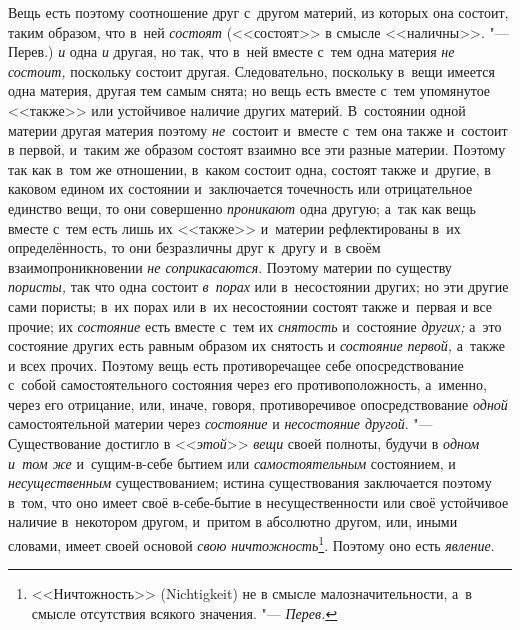 Вещь есть поэтому соотношение друг с~другом материй, из которых она состоит,
таким образом, что в~ней {\em состоят} (<<состоят>> в
смысле <<наличны>>. "--- Перев.) {\em и} одна
{\em и} другая, но так, что в~ней вместе с~тем одна
материя {\em не состоит,} поскольку состоит другая.
Следовательно, поскольку в~вещи имеется одна материя, другая тем самым
снята; но вещь есть вместе с~тем упомянутое <<также>> или устойчивое наличие
других материй. В~состоянии одной материи другая материя поэтому
{\em не}~состоит и~вместе с~тем она также и~состоит в
первой, и~таким же образом состоят взаимно все эти разные материи. Поэтому
так как в~том же отношении, в~каком состоит одна, состоят также и~другие, в
каковом едином их состоянии и~заключается точечность или отрицательное
единство вещи, то они совершенно {\em проникают} одна
другую; а~так как вещь вместе с~тем есть лишь их <<также>> и~материи
рефлектированы в~их определённость, то они безразличны друг к~другу и~в
своём взаимопроникновении {\em не соприкасаются}.
Поэтому материи по существу {\em пористы,} так что одна
состоит {\em в~порах} или в~несостоянии других; но эти
другие сами пористы; в~их порах или в~их несостоянии состоят также и~первая
и все прочие; их {\em состояние} есть вместе с~тем их
{\em снятость} и~состояние {\em других;} а~это состояние других есть равным
образом их снятость и {\em состояние первой,} а~также и
всех прочих. Поэтому вещь есть противоречащее себе опосредствование с~собой
самостоятельного состояния через его противоположность, а~именно, через его
отрицание, или, иначе, говоря, противоречивое опосредствование
{\em одной} самостоятельной материи через {\em состояние} и {\em несостояние
другой}. "--- Существование достигло в <<{\em этой}>> {\em вещи} своей
полноты, будучи в {\em одном и~том же} и~сущим-в-себе
бытием или {\em самостоятельным} состоянием, и
{\em несущественным} существованием; истина
существования заключается поэтому в~том, что оно имеет своё в-себе-бытие в
несущественности или своё устойчивое наличие в~некотором другом, и~притом в
абсолютно другом, или, иными словами, имеет своей основой
{\em свою ничтожность}\footnote{<<Ничтожность>> (Nichtig\-keit) не
в смысле малозначительности, а~в смысле отсутствия всякого
значения. "--- {\em Перев.}}. Поэтому оно есть {\em явление}.


